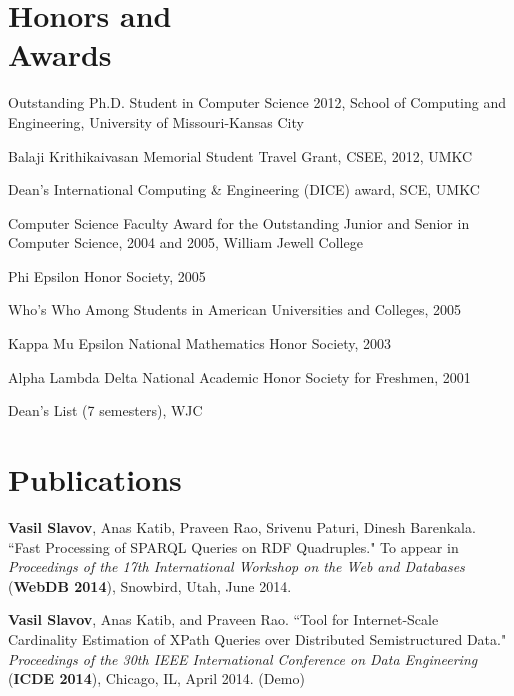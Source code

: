 \documentclass[margin,line]{resume}
\begin{document}
\begin{resume}
    \section{\mysidestyle Honors and\\Awards} 
    \begin{list3}
    \item Outstanding Ph.D. Student in Computer Science 2012, School of Computing and Engineering, University of Missouri-Kansas City
    \item Balaji Krithikaivasan Memorial Student Travel Grant, CSEE, 2012, UMKC
    \item Dean's International Computing \& Engineering (DICE) award, SCE, UMKC
    \item Computer Science Faculty Award for the Outstanding Junior and Senior in Computer Science, 2004 and 2005, William Jewell College
    \item Phi Epsilon Honor Society, 2005
    \item Who's Who Among Students in American Universities and Colleges, 2005
    \item Kappa Mu Epsilon National Mathematics Honor Society, 2003
    \item Alpha Lambda Delta National Academic Honor Society for Freshmen, 2001
    \item Dean's List (7 semesters), WJC
    \end{list3}

    \section{\mysidestyle Publications}

\textbf{Vasil Slavov}, Anas Katib, Praveen Rao, Srivenu Paturi, Dinesh Barenkala.
    ``Fast Processing of SPARQL Queries on RDF Quadruples."
    To appear in \textsl{Proceedings of the 17th International Workshop on the Web and Databases} (\textbf{WebDB 2014}), Snowbird, Utah, June 2014.

\vspace{-2mm}
    \textbf{Vasil Slavov}, Anas Katib, and Praveen Rao.
    ``Tool for Internet-Scale Cardinality Estimation of XPath Queries over Distributed Semistructured Data."
    \textsl{Proceedings of the 30th IEEE International Conference on Data Engineering} (\textbf{ICDE 2014}), Chicago, IL, April 2014. (Demo)


\end{resume}
\end{document}
